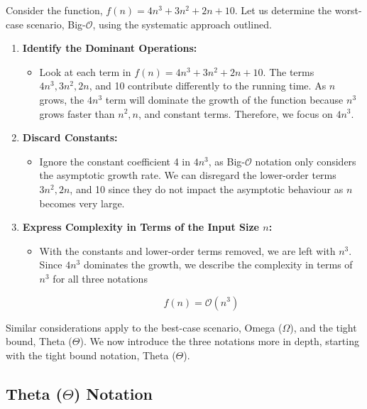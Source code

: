 \begin{example}

Consider the function, $f(n)=4 n^3+3 n^2+2 n+10$. Let us determine the worst-case scenario, Big-$\mathcal{O}$, using the systematic approach outlined.
    \begin{enumerate}
        \item \textbf{Identify the Dominant Operations:}
        \begin{itemize}
            \item Look at each term in $f(n)=4 n^3+3 n^2+2 n+10$.
            The terms $4 n^3, 3 n^2, 2 n$, and 10 contribute differently to the running time.
            As $n$ grows, the $4 n^3$ term will dominate the growth of the function because $n^3$ grows faster than $n^2, n$, and constant terms. Therefore, we focus on $4 n^3$.
        \end{itemize}
        \item \textbf{Discard Constants:}
        \begin{itemize}
            \item Ignore the constant coefficient 4 in $4 n^3$, as Big-$\mathcal{O}$ notation only considers the asymptotic growth rate.
            We can disregard the lower-order terms $3 n^2, 2 n$, and 10 since they do not impact the asymptotic behaviour as $n$ becomes very large.
        \end{itemize}
        \item \textbf{Express Complexity in Terms of the Input Size $n$:}
        \begin{itemize}
            \item With the constants and lower-order terms removed, we are left with $n^3$.
            Since $4 n^3$ dominates the growth, we describe the complexity in terms of $n^3$ for all three notations

            \[
                f(n)=\mathcal{O}\left(n^3\right)
            \]
        \end{itemize}
    \end{enumerate}
\end{example}

Similar considerations apply to the best-case scenario, Omega ($\Omega$), and the tight bound, Theta ($\Theta$). We now introduce the three notations more in depth, starting with the tight bound notation, Theta ($\Theta$).

\subsection*{Theta (\texorpdfstring{$\Theta$}{Theta}) Notation}

